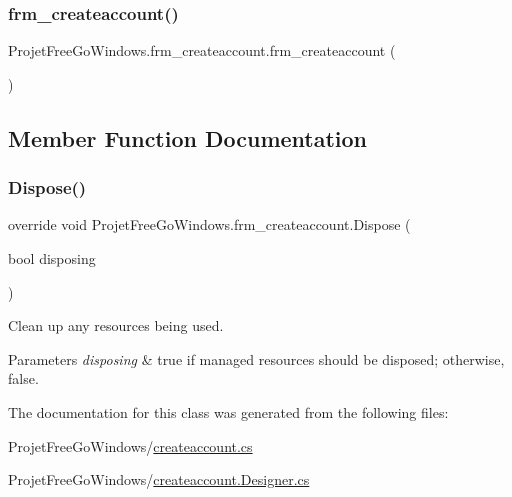 \subsubsection{\texorpdfstring{frm\+\_\+createaccount()}{frm\_createaccount()}}
{\footnotesize\ttfamily Projet\+Free\+Go\+Windows.\+frm\+\_\+createaccount.\+frm\+\_\+createaccount (\begin{DoxyParamCaption}{ }\end{DoxyParamCaption})}



\subsection{Member Function Documentation}
\mbox{\label{class_projet_free_go_windows_1_1frm__createaccount_ae4434d178daa39bcdcef1f6119e81486}} 
\subsubsection{\texorpdfstring{Dispose()}{Dispose()}}
{\footnotesize\ttfamily override void Projet\+Free\+Go\+Windows.\+frm\+\_\+createaccount.\+Dispose (\begin{DoxyParamCaption}\item[{bool}]{disposing }\end{DoxyParamCaption})\hspace{0.3cm}{\ttfamily [protected]}}



Clean up any resources being used. 


\begin{DoxyParams}{Parameters}
{\em disposing} & true if managed resources should be disposed; otherwise, false.\\
\hline
\end{DoxyParams}


The documentation for this class was generated from the following files\+:\begin{DoxyCompactItemize}
\item 
Projet\+Free\+Go\+Windows/\hyperlink{createaccount_8cs}{createaccount.\+cs}\item 
Projet\+Free\+Go\+Windows/\hyperlink{createaccount_8_designer_8cs}{createaccount.\+Designer.\+cs}\end{DoxyCompactItemize}
